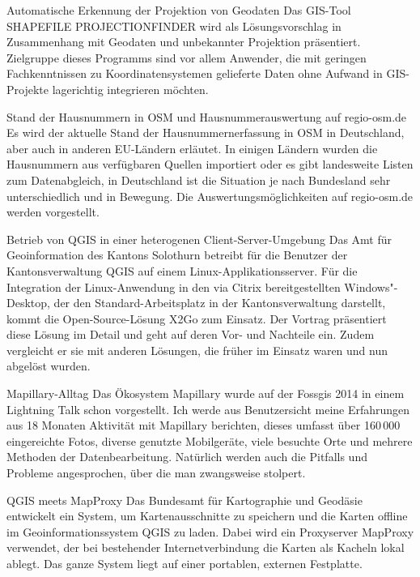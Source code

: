 %
{Automatische Erkennung der Projektion von Geodaten}%
{}%
{Das GIS-Tool SHAPEFILE PROJECTIONFINDER wird als Lösungsvorschlag
in Zusammenhang mit Geodaten und
unbekannter Projektion präsentiert. Zielgruppe dieses Programms sind vor
allem Anwender, die mit geringen
Fachkenntnissen zu Koordinatensystemen gelieferte Daten ohne Aufwand in
GIS-Projekte lagerichtig integrieren möchten.}

%
{Stand der Hausnummern in OSM und Hausnummerauswertung auf regio-osm.de}%
{}%
{Es wird der aktuelle Stand der Hausnummernerfassung in OSM in Deutschland, aber auch in anderen EU-Ländern erläutet.
In einigen Ländern wurden die Hausnummern aus verfügbaren Quellen importiert
oder es gibt landesweite Listen zum Datenabgleich, in Deutschland ist die
Situation je nach Bundesland sehr unterschiedlich und in Bewegung.
Die Auswertungsmöglichkeiten auf regio-osm.de werden vorgestellt.}


%
{Betrieb von QGIS in einer hete\-rogenen Client-Server-Umgebung}%
{}%
{Das Amt für Geoinformation des Kantons Solothurn betreibt für die Benutzer der
Kantonsverwaltung QGIS auf einem Linux-Applikationsserver. Für die Integration
der Linux-Anwendung in den via Citrix bereitgestellten Windows"-Desktop, der den
Standard-Arbeitsplatz in der Kantonsverwaltung darstellt, kommt die Open-Source-Lösung X2Go zum Einsatz.
Der Vortrag präsentiert diese Lösung im Detail und geht auf deren Vor- und
Nachteile ein. Zudem vergleicht er sie mit anderen Lösungen, die früher im Einsatz waren und nun abgelöst wurden.}

%
{Mapillary-Alltag}%
{}%
{Das Ökosystem Mapillary wurde auf der Fossgis 2014 in einem Lightning
Talk schon vorgestellt.
Ich werde aus Benutzersicht meine Erfahrungen aus 18 Monaten Aktivität mit
Mapillary berichten, dieses umfasst über 160\,000 eingereichte Fotos,
diverse genutzte Mobilgeräte, viele besuchte Orte und mehrere Methoden
der Datenbearbeitung. Natürlich werden auch die Pitfalls und Probleme angesprochen, über die
man zwangsweise stolpert.}


%
{QGIS meets MapProxy}%
{}%
{Das Bundesamt für Kartographie und Geodäsie entwickelt ein System, um Kartenausschnitte zu speichern und
die Karten offline im Geoinformationssystem QGIS zu laden. Dabei wird ein
Proxyserver MapProxy verwendet, der bei bestehender Internetverbindung
die Karten als Kacheln lokal ablegt. Das ganze System liegt auf einer
portablen, externen Festplatte.}

